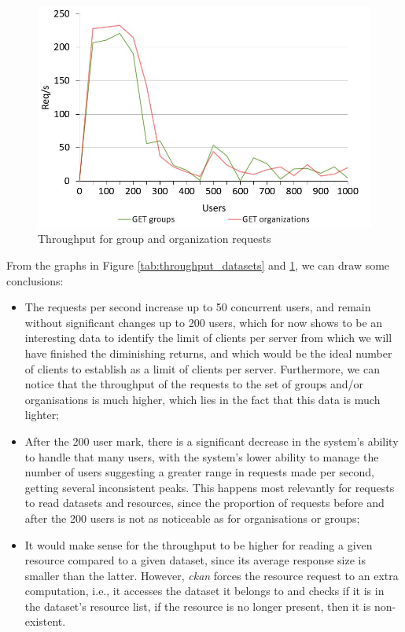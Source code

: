  
  \begin{figure}[H]
    \centering
    \includegraphics[width=.7\textwidth]{img/performance_evaluation/groups_organizations_individuais.JPG}
    \caption{\label{tab:throughput_groups_org}Throughput for group and organization requests}
  \end{figure}
  
  From the graphs in Figure \ref{tab:throughput_datasets} and \ref{tab:throughput_groups_org}, we can draw some conclusions:
  
  \begin{itemize}
      \item The requests per second increase up to 50 concurrent users, and remain without significant changes up to 200 users, which for now shows to be an interesting data to identify the limit of clients per server from which we will have finished the diminishing returns, and which would be the ideal number of clients to establish as a limit of clients per server. Furthermore, we can notice that the throughput of the requests to the set of groups and/or organisations is much higher, which lies in the fact that this data is much lighter;
      \item After the 200 user mark, there is a significant decrease in the system's ability to handle that many users, with the system's lower ability to manage the number of users suggesting a greater range in requests made per second, getting several inconsistent peaks. This happens most relevantly for requests to read datasets and resources, since the proportion of requests before and after the 200 users is not as noticeable as for organisations or groups;
      \item It would make sense for the throughput to be higher for reading a given resource compared to a given dataset, since its average response size is smaller than the latter. However, \textit{\gls{ckan}} forces the resource request to an extra computation, i.e., it accesses the dataset it belongs to and checks if it is in the dataset's resource list, if the resource is no longer present, then it is non-existent.
  \end{itemize}
  
